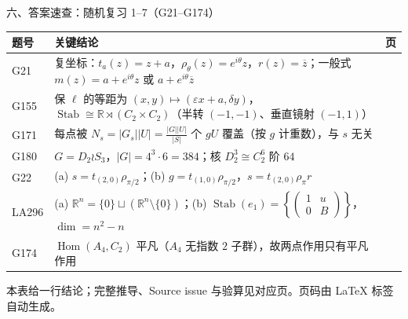 \documentclass[aspectratio=169,10pt,fontset=none]{ctexbeamer}
\begin{document}
\begin{frame}[t]{六、答案速查：随机复习 1--7（G21--G174）}
  \label{sec:answers}
  \centering
  \scriptsize
  \setlength{\tabcolsep}{3pt}
  \renewcommand{\arraystretch}{1.16}
  \begin{tabular}{@{}l p{10.0cm} c@{}}
    \toprule
    题号 & 关键结论 & 页\\
    \midrule
    G21 & 复坐标：$t_a(z)=z+a$，$\rho_\theta(z)=e^{i\theta}z$，$r(z)=\overline z$；一般式 $m(z)=a+e^{i\theta}z$ 或 $a+e^{i\theta}\overline z$ & \pageref{ex:G21}\\
    G155 & 保 $\ell$ 的等距为 $(x,y)\mapsto(\varepsilon x+a,\delta y)$，$\operatorname{Stab}\cong\mathbb R\rtimes(C_2\times C_2)$（半转 $(-1,-1)$、垂直镜射 $(-1,1)$） & \pageref{ex:G155}\\
    G171 & 每点被 $N_s=|G_s||U|=\frac{|G||U|}{|S|}$ 个 $gU$ 覆盖（按 $g$ 计重数），与 $s$ 无关 & \pageref{ex:G171}\\
    G180 & $G=D_2\wr S_3$，$|G|=4^3\cdot6=384$；核 $D_2^3\cong C_2^6$ 阶 $64$ & \pageref{ex:G180}\\
    G22 & (a) $s=t_{(2,0)}\rho_{\pi/2}$；(b) $g=t_{(1,0)}\rho_{\pi/2}$，$s=t_{(2,0)}\rho_\pi r$ & \pageref{ex:G22}\\
    LA296 & (a) $\mathbb R^n=\{0\}\sqcup(\mathbb R^n\setminus\{0\})$；(b) $\operatorname{Stab}(e_1)=\left\{\left(\begin{smallmatrix}1&u\\0&B\end{smallmatrix}\right)\right\}$，$\dim=n^2-n$ & \pageref{ex:LA296}\\
    G174 & $\operatorname{Hom}(A_4,C_2)$ 平凡（$A_4$ 无指数 $2$ 子群），故两点作用只有平凡作用 & \pageref{ex:G174}\\
    \bottomrule
  \end{tabular}
  \par
  \vspace{0.3em}
  {\scriptsize\color{ink!70} 本表给一行结论；完整推导、Source issue 与验算见对应页。页码由 \LaTeX{} 标签自动生成。}
\end{frame}
\end{document}
